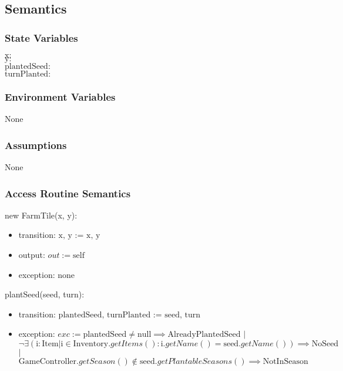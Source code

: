 \documentclass[12pt, titlepage]{article}
\begin{document}
\subsection{Semantics}

\subsubsection{State Variables}
$\text{x}:$ \\
$\text{y}:$ \\
$\text{plantedSeed}:$ \\
$\text{turnPlanted}:$ \\

\subsubsection{Environment Variables}

None

\subsubsection{Assumptions}

None

\subsubsection{Access Routine Semantics}

\noindent new FarmTile(x, y):
\begin{itemize}
\item transition: $\text{x, y := x, y}$
\item output: $out := \text{self}$
\item exception: none
\end{itemize}

\noindent plantSeed(seed, turn):
\begin{itemize}
\item transition: $\text{plantedSeed, turnPlanted := seed, turn}$
\item exception: $exc := \text{plantedSeed} \neq \text{null} \implies \text{AlreadyPlantedSeed}$ $|$\\ $  \neg \exists (\text{i} : \text{Item} | \text{i} \in \text{Inventory}.getItems() : \text{i}.getName() = \text{seed}.getName()) \implies \text{NoSeed}$ $|$\\ $\text{GameController}.getSeason() \notin \text{seed}.getPlantableSeasons() \implies \text{NotInSeason}$
\end{itemize}
\end{document}
